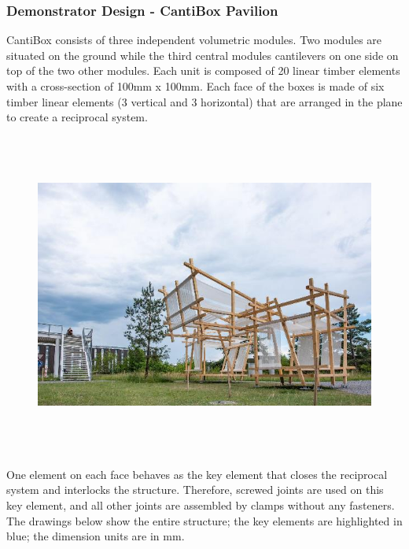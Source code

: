 \documentclass[11pt]{book}
\begin{document}
\subsubsection{Demonstrator Design - CantiBox Pavilion}

CantiBox consists of three independent volumetric modules. Two modules are situated on the ground while the third central modules cantilevers on one side on top of the two other modules. Each unit is composed of 20 linear timber elements with a cross-section of 100mm x 100mm. Each face of the boxes is made of six timber linear elements (3 vertical and 3 horizontal) that are arranged in the plane to create a reciprocal system. 

\begin{figure}[H]
\includegraphics[width=15.92cm,height=10.62cm]{./images/image22.jpeg}
\end{figure}


One element on each face behaves as the key element that closes the reciprocal system and interlocks the structure. Therefore, screwed joints are used on this key element, and all other joints are assembled by clamps without any fasteners. The drawings below show the entire structure; the key elements are highlighted in blue; the dimension units are in mm. 
\end{document}
